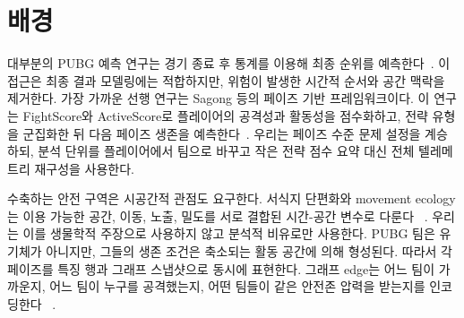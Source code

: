 \section{배경}
\label{sec:background}

대부분의 PUBG 예측 연구는 경기 종료 후 통계를 이용해 최종 순위를
예측한다~\cite{kagglePubgFinishPlacement,sen2021pubgFinalRank,lee2025pubgRank}.
이 접근은 최종 결과 모델링에는 적합하지만, 위험이 발생한 시간적
순서와 공간 맥락을 제거한다. 가장 가까운 선행 연구는 Sagong 등의
페이즈 기반 프레임워크이다. 이 연구는 FightScore와 ActiveScore로
플레이어의 공격성과 활동성을 점수화하고, 전략 유형을 군집화한 뒤
다음 페이즈 생존을 예측한다~\cite{sagong2025hunterCamper}. 우리는
페이즈 수준 문제 설정을 계승하되, 분석 단위를 플레이어에서 팀으로
바꾸고 작은 전략 점수 요약 대신 전체 텔레메트리 재구성을 사용한다.

수축하는 안전 구역은 시공간적 관점도 요구한다. 서식지 단편화와
movement ecology는 이용 가능한 공간, 이동, 노출, 밀도를 서로 결합된
시간-공간 변수로 다룬다
~\cite{fahrig2003fragmentation,nathan2008movement}. 우리는 이를
생물학적 주장으로 사용하지 않고 분석적 비유로만 사용한다. PUBG 팀은
유기체가 아니지만, 그들의 생존 조건은 축소되는 활동 공간에 의해
형성된다. 따라서 각 페이즈를 특징 행과 그래프 스냅샷으로 동시에
표현한다. 그래프 edge는 어느 팀이 가까운지, 어느 팀이 누구를
공격했는지, 어떤 팀들이 같은 안전존 압력을 받는지를 인코딩한다
~\cite{sanchezLengeling2021gnnIntro}.
